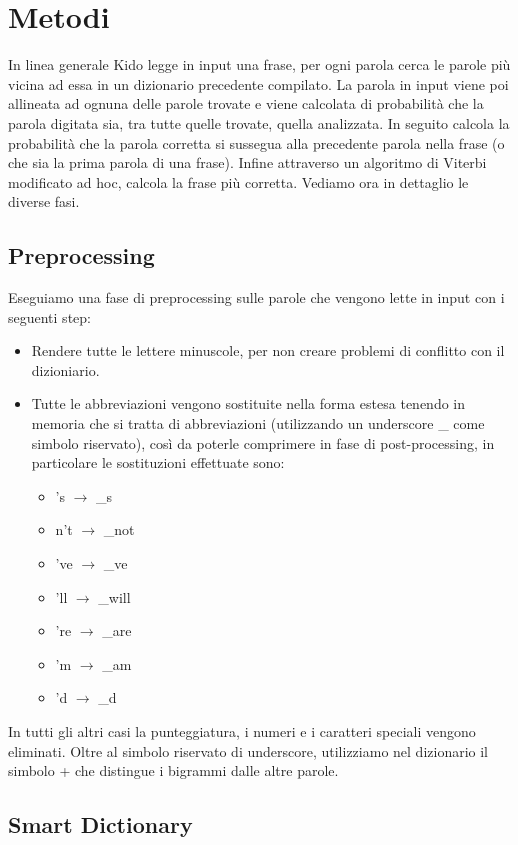 \section{Metodi}
In linea generale Kido legge in input una frase, per ogni parola
cerca le parole pi\`u vicina ad essa in un dizionario precedente
compilato. La parola in input viene poi allineata ad ognuna delle
parole trovate e viene calcolata di probabilit\`a che la parola
digitata sia, tra tutte quelle trovate, quella analizzata.
In seguito calcola la probabilit\`a che la parola corretta si
sussegua alla precedente parola nella frase (o che sia la prima 
parola di una frase). Infine attraverso un algoritmo di Viterbi 
modificato ad hoc, calcola la frase pi\`u corretta. 
Vediamo ora in dettaglio le diverse fasi.

\subsection{Preprocessing}
\label{sec:preproc}
Eseguiamo una fase di preprocessing sulle parole che vengono lette
in input con i seguenti step:
\begin{itemize}
  \item Rendere tutte le lettere minuscole, per non creare problemi
  di conflitto con il dizioniario.
  \item Tutte le abbreviazioni vengono sostituite nella forma estesa
  tenendo in memoria che si tratta di abbreviazioni
   (utilizzando un underscore \_ come simbolo riservato), cos\`i da 
  poterle comprimere in fase di post-processing, in particolare le 
  sostituzioni effettuate sono:
  \begin{itemize}
    \item 's $\rightarrow$ \_s
    \item n't $\rightarrow$ \_not
    \item 've $\rightarrow$ \_ve
    \item 'll $\rightarrow$ \_will
    \item 're $\rightarrow$ \_are
    \item 'm $\rightarrow$ \_am
    \item 'd $\rightarrow$ \_d
  \end{itemize}
\end{itemize}
In tutti gli altri casi la punteggiatura, i numeri e i caratteri
speciali vengono eliminati. Oltre al simbolo riservato di underscore,
utilizziamo nel dizionario il simbolo + che distingue i bigrammi 
dalle altre parole.
\subsection{Smart Dictionary}

